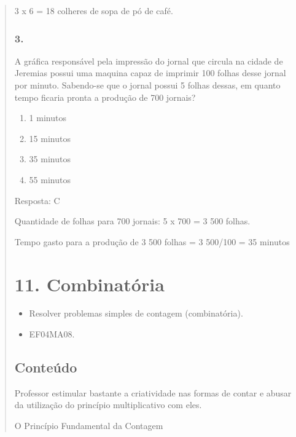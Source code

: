 \begin{enumerate}
\begin{escolha}
\begin{enumerate}
\begin{itemize}
\begin{itemize}
\begin{escolha}
\begin{quote}
\begin{escolha}
{3 x 6 = 18 colheres de sopa de pó de café.

\subsubsection{3.}\label{section-129}

A gráfica responsável pela impressão do jornal que circula na cidade de
Jeremias possui uma maquina capaz de imprimir 100 folhas desse jornal
por minuto. Sabendo-se que o jornal possui 5 folhas dessas, em quanto
tempo ficaria pronta a produção de 700 jornais?

\begin{enumerate}
\def\labelenumi{\alph{enumi})}
\item
  1 minutos
\item
  15 minutos
\item
  35 minutos
\item
  55 minutos
\end{enumerate}

Resposta: C

Quantidade de folhas para 700 jornais: 5 x 700 = 3 500 folhas.

Tempo gasto para a produção de 3 500 folhas = 3 500/100 = 35 minutos

\section{11. Combinatória}\label{muxf3dulo-11}


\begin{itemize}
\item Resolver problemas simples de contagem (combinatória).
\end{itemize}


\begin{itemize}
\item EF04MA08.
\end{itemize}

\subsection{Conteúdo}\label{conteuxfado-10}

Professor estimular bastante a criatividade nas formas de contar e
abusar da utilização do princípio multiplicativo com eles.

O Princípio Fundamental da Contagem

}
\end{escolha}
\end{quote}
\end{escolha}
\end{itemize}
\end{itemize}
\end{enumerate}
\end{escolha}
\end{enumerate}
